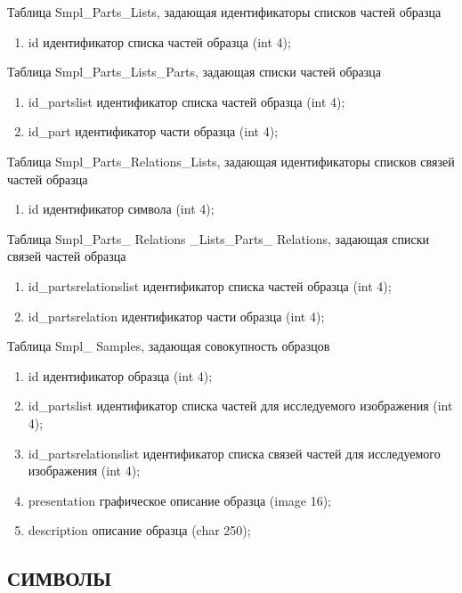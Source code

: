 \noindent 
Таблица Smpl\_Parts\_Lists, задающая идентификаторы списков частей образца
\small
\begin{enumerate}
\item id         			 идентификатор списка частей образца (int 4);
\end{enumerate}
\normalsize


\noindent 
Таблица Smpl\_Parts\_Lists\_Parts, задающая списки частей образца
\small
\begin{enumerate}
\item id\_partslist 		идентификатор списка частей образца (int 4);
\item id\_part			идентификатор части образца (int 4);
\end{enumerate}
\normalsize


\noindent 
Таблица Smpl\_Parts\_Relations\_Lists, задающая идентификаторы списков связей частей образца
\small
\begin{enumerate}
\item id			        	 идентификатор символа (int 4);
\end{enumerate}
\normalsize


\noindent 
Таблица Smpl\_Parts\_ Relations \_Lists\_Parts\_ Relations, задающая списки связей частей образца
\small
\begin{enumerate}
\item id\_partsrelationslist          	идентификатор списка частей образца (int 4);
\item id\_partsrelation                 	идентификатор части образца (int 4);
\end{enumerate}
\normalsize


\noindent
 Таблица Smpl\_ Samples, задающая совокупность образцов
\small
\begin{enumerate}
\item id			     	идентификатор образца (int 4);
\item id\_partslist		    	идентификатор списка частей для исследуемого изображения (int 4);
\item id\_partsrelationslist	идентификатор списка связей частей для исследуемого изображения  (int 4);                                   
\item presentation  		графическое описание образца (image   16);
\item description            		описание образца (char   250);
\end{enumerate}
\normalsize

\noindent
\subsection*{СИМВОЛЫ}

